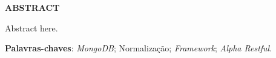\vfill
\begin{center}
{\textbf{ABSTRACT}\\}
\end{center}

\noindent

Abstract here.
 
 \vspace{\onelineskip}
    
 \noindent
 \textbf{Palavras-chaves}: \textit{MongoDB}; Normalização; \textit{Framework}; \textit{Alpha Restful}.
